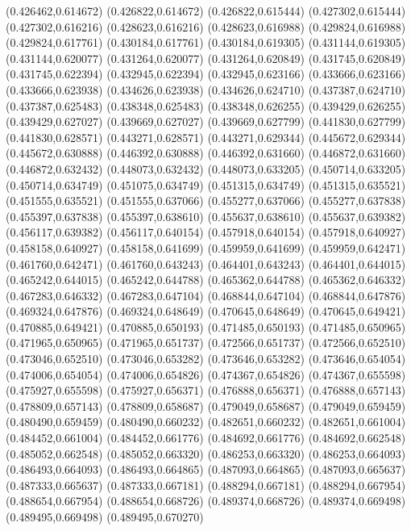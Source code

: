 (0.426462,0.614672)
(0.426822,0.614672)
(0.426822,0.615444)
(0.427302,0.615444)
(0.427302,0.616216)
(0.428623,0.616216)
(0.428623,0.616988)
(0.429824,0.616988)
(0.429824,0.617761)
(0.430184,0.617761)
(0.430184,0.619305)
(0.431144,0.619305)
(0.431144,0.620077)
(0.431264,0.620077)
(0.431264,0.620849)
(0.431745,0.620849)
(0.431745,0.622394)
(0.432945,0.622394)
(0.432945,0.623166)
(0.433666,0.623166)
(0.433666,0.623938)
(0.434626,0.623938)
(0.434626,0.624710)
(0.437387,0.624710)
(0.437387,0.625483)
(0.438348,0.625483)
(0.438348,0.626255)
(0.439429,0.626255)
(0.439429,0.627027)
(0.439669,0.627027)
(0.439669,0.627799)
(0.441830,0.627799)
(0.441830,0.628571)
(0.443271,0.628571)
(0.443271,0.629344)
(0.445672,0.629344)
(0.445672,0.630888)
(0.446392,0.630888)
(0.446392,0.631660)
(0.446872,0.631660)
(0.446872,0.632432)
(0.448073,0.632432)
(0.448073,0.633205)
(0.450714,0.633205)
(0.450714,0.634749)
(0.451075,0.634749)
(0.451315,0.634749)
(0.451315,0.635521)
(0.451555,0.635521)
(0.451555,0.637066)
(0.455277,0.637066)
(0.455277,0.637838)
(0.455397,0.637838)
(0.455397,0.638610)
(0.455637,0.638610)
(0.455637,0.639382)
(0.456117,0.639382)
(0.456117,0.640154)
(0.457918,0.640154)
(0.457918,0.640927)
(0.458158,0.640927)
(0.458158,0.641699)
(0.459959,0.641699)
(0.459959,0.642471)
(0.461760,0.642471)
(0.461760,0.643243)
(0.464401,0.643243)
(0.464401,0.644015)
(0.465242,0.644015)
(0.465242,0.644788)
(0.465362,0.644788)
(0.465362,0.646332)
(0.467283,0.646332)
(0.467283,0.647104)
(0.468844,0.647104)
(0.468844,0.647876)
(0.469324,0.647876)
(0.469324,0.648649)
(0.470645,0.648649)
(0.470645,0.649421)
(0.470885,0.649421)
(0.470885,0.650193)
(0.471485,0.650193)
(0.471485,0.650965)
(0.471965,0.650965)
(0.471965,0.651737)
(0.472566,0.651737)
(0.472566,0.652510)
(0.473046,0.652510)
(0.473046,0.653282)
(0.473646,0.653282)
(0.473646,0.654054)
(0.474006,0.654054)
(0.474006,0.654826)
(0.474367,0.654826)
(0.474367,0.655598)
(0.475927,0.655598)
(0.475927,0.656371)
(0.476888,0.656371)
(0.476888,0.657143)
(0.478809,0.657143)
(0.478809,0.658687)
(0.479049,0.658687)
(0.479049,0.659459)
(0.480490,0.659459)
(0.480490,0.660232)
(0.482651,0.660232)
(0.482651,0.661004)
(0.484452,0.661004)
(0.484452,0.661776)
(0.484692,0.661776)
(0.484692,0.662548)
(0.485052,0.662548)
(0.485052,0.663320)
(0.486253,0.663320)
(0.486253,0.664093)
(0.486493,0.664093)
(0.486493,0.664865)
(0.487093,0.664865)
(0.487093,0.665637)
(0.487333,0.665637)
(0.487333,0.667181)
(0.488294,0.667181)
(0.488294,0.667954)
(0.488654,0.667954)
(0.488654,0.668726)
(0.489374,0.668726)
(0.489374,0.669498)
(0.489495,0.669498)
(0.489495,0.670270)
